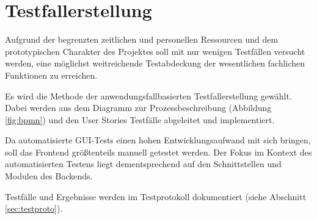 \documentclass[a4paper,11pt,listof=numbered,glossary=totoc,parskip=half,toc=bib]{scrreprt}
\begin{document}
	\section{Testfallerstellung}
	Aufgrund der begrenzten zeitlichen und personellen Ressourcen und dem prototypischen Charakter des Projektes soll mit nur wenigen Testfällen versucht werden, eine möglichst weitreichende Testabdeckung der wesentlichen fachlichen Funktionen zu erreichen.
	
	Es wird die Methode der anwendungsfallbasierten Testfallerstellung gewählt. Dabei werden aus dem Diagramm zur Prozessbeschreibung (Abbildung \ref{fig:bpmn}) und den User Stories Testfälle abgeleitet und implementiert. 
	
	Da automatisierte GUI-Tests einen hohen Entwicklungsaufwand mit sich bringen, soll das Frontend größtenteils manuell getestet werden. Der Fokus im Kontext des automatisierten Testens liegt dementsprechend auf den Schnittstellen und Modulen des Backends. 
	
	Testfälle und Ergebnisse werden im Testprotokoll dokumentiert (siehe Abschnitt \ref{sec:testproto}).
	
	\printglossaries
	\newpage	
	\printbibliography[heading=bibnumbered,title=Literaturverzeichnis]
\end{document}
